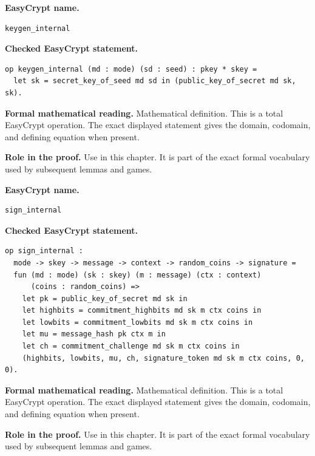 \begin{formaldefinition}
\noindent\textbf{EasyCrypt name.}
\begin{lstlisting}[language=EasyCrypt,basicstyle=\ttfamily\scriptsize]
keygen_internal
\end{lstlisting}
\noindent\textbf{Checked EasyCrypt statement.}
\begin{lstlisting}[language=EasyCrypt,basicstyle=\ttfamily\scriptsize]
op keygen_internal (md : mode) (sd : seed) : pkey * skey =
  let sk = secret_key_of_seed md sd in (public_key_of_secret md sk, sk).
\end{lstlisting}
\noindent\textbf{Formal mathematical reading.}
Mathematical definition. This is a total EasyCrypt operation.  The exact displayed statement gives the domain, codomain, and defining equation when present.

\noindent\textbf{Role in the proof.}
Use in this chapter. It is part of the exact formal vocabulary used by subsequent lemmas and games.

\end{formaldefinition}

\begin{formaldefinition}
\noindent\textbf{EasyCrypt name.}
\begin{lstlisting}[language=EasyCrypt,basicstyle=\ttfamily\scriptsize]
sign_internal
\end{lstlisting}
\noindent\textbf{Checked EasyCrypt statement.}
\begin{lstlisting}[language=EasyCrypt,basicstyle=\ttfamily\scriptsize]
op sign_internal :
  mode -> skey -> message -> context -> random_coins -> signature =
  fun (md : mode) (sk : skey) (m : message) (ctx : context)
      (coins : random_coins) =>
    let pk = public_key_of_secret md sk in
    let highbits = commitment_highbits md sk m ctx coins in
    let lowbits = commitment_lowbits md sk m ctx coins in
    let mu = message_hash pk ctx m in
    let ch = commitment_challenge md sk m ctx coins in
    (highbits, lowbits, mu, ch, signature_token md sk m ctx coins, 0, 0).
\end{lstlisting}
\noindent\textbf{Formal mathematical reading.}
Mathematical definition. This is a total EasyCrypt operation.  The exact displayed statement gives the domain, codomain, and defining equation when present.

\noindent\textbf{Role in the proof.}
Use in this chapter. It is part of the exact formal vocabulary used by subsequent lemmas and games.

\end{formaldefinition}

